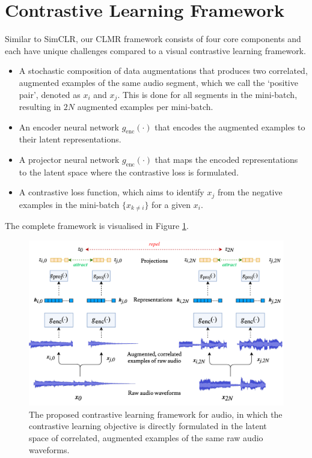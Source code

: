\documentclass{report}
\begin{document}
\section{Contrastive Learning Framework}
Similar to SimCLR, our CLMR framework consists of four core components and each have unique challenges compared to a visual contrastive learning framework.
\begin{itemize}
    \item A stochastic composition of data augmentations that produces two correlated, augmented examples of the same audio segment, which we call the `positive pair', denoted as $x_i$ and $x_j$. This is done for all segments in the mini-batch, resulting in $2N$ augmented examples per mini-batch.
    \item An encoder neural network $g_{\mathrm{enc}}(\cdot)$ that encodes the augmented examples to their latent representations.
    \item A projector neural network $g_{\mathrm{enc}}(\cdot)$ that maps the encoded representations to the latent space where the contrastive loss is formulated.
    \item A contrastive loss function, which aims to identify $x_j$ from the negative examples in the mini-batch $\{x_{k\neq i}\}$ for a given $x_i$.
\end{itemize}

The complete framework is visualised in Figure \ref{fig:clmr_model}.

\begin{figure}[t]
    \centering
    \includegraphics[width=.75\columnwidth]{figs/clmr_model.png}
    \caption{The proposed contrastive learning framework for audio, in which the contrastive learning objective is directly formulated in the latent space of correlated, augmented examples of the same raw audio waveforms.}
    \label{fig:clmr_model}
\end{figure}
\end{document}
